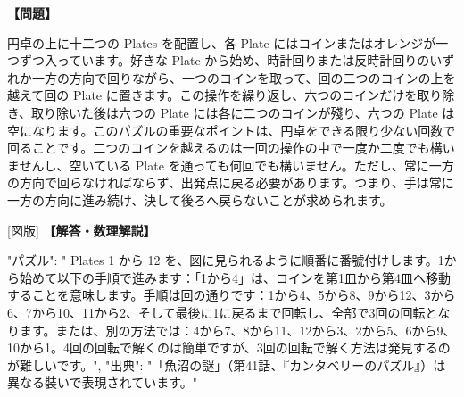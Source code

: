 \documentclass[10pt,a4paper,oneside,openany]{ltjsbook}
\begin{document}
\begin{tcolorbox}[colback=softblue,colframe=primaryblue,title=\textbf{第 231 問：PLATES AND COINS.},arc=2mm,boxrule=1pt,breakable]
\textbf{【問題】}\par\vspace{0.3em}
円卓の上に十二つの Plates を配置し、各 Plate にはコインまたはオレンジが一つずつ入っています。好きな Plate から始め、時計回りまたは反時計回りのいずれか一方の方向で回りながら、一つのコインを取って、回の二つのコインの上を越えて回の Plate に置きます。この操作を繰り返し、六つのコインだけを取り除き、取り除いた後は六つの Plate には各に二つのコインが殘り、六つの Plate は空になります。このパズルの重要なポイントは、円卓をできる限り少ない回数で回ることです。二つのコインを越えるのは一回の操作の中で一度か二度でも構いませんし、空いている Plate を通っても何回でも構いません。ただし、常に一方の方向で回らなければならず、出発点に戻る必要があります。つまり、手は常に一方の方向に進み続け、決して後ろへ戻らないことが求められます。

[図版]
\tcblower
\textbf{【解答・数理解説】}\par\vspace{0.3em}
{
"パズル": " Plates 1 から 12 を、図に見られるように順番に番號付けします。1から始めて以下の手順で進みます：「1から4」は、コインを第1皿から第4皿へ移動することを意味します。手順は回の通りです：1から4、5から8、9から12、3から6、7から10、11から2、そして最後に1に戻るまで回転し、全部で3回の回転となります。または、別の方法では：4から7、8から11、12から3、2から5、6から9、10から1。4回の回転で解くのは簡単ですが、3回の回転で解く方法は発見するのが難しいです。",
"出典": "「魚沼の謎」（第41話、『カンタベリーのパズル』）は異なる裝いで表現されています。"
}
\end{tcolorbox}
\end{document}
